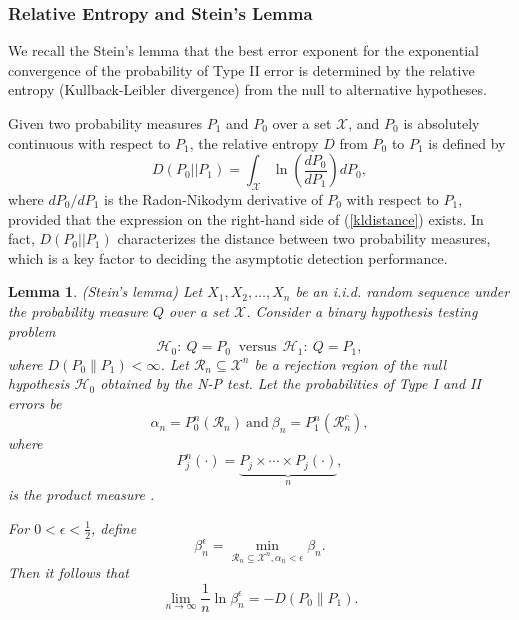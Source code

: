 \documentclass[journal]{IEEEtran}
\def\cH{\mathcal{H}}
\def\cR{\mathcal{R}}
\def\cX{\mathcal{X}}
\def\bee{\begin{equation}}
\def\ene{\end{equation}}
\newtheorem{lem}{Lemma}
\begin{document}
\subsubsection{Relative Entropy and Stein's Lemma}
We recall the Stein's lemma \cite{cover2006eit} that the best error exponent for the exponential convergence of the probability of Type II error is determined by the relative entropy (Kullback-Leibler divergence) from the null to alternative hypotheses.

 Given two probability measures $P_1$ and $P_0$ over a set $\cX$, and $
P_0$ is absolutely continuous with respect to $P_1$, the relative entropy $D$ from $P_0$ to $P_1$ is defined by
\begin{equation}
\label{kldistance}
D({P_0} || {P_1})=\int_\cX\ln\left(\frac{dP_0}{dP_1} \right)dP_0,
\end{equation}
where $dP_0/dP_1 $ is the Radon-Nikodym derivative \cite{ash2000pam} of $P_0$ with respect to $P_1$, provided that the expression on the right-hand side of (\ref{kldistance}) exists. In fact, $D(P_0||P_1)$ characterizes the distance between two probability measures, which is a key factor to deciding the asymptotic detection performance.

\begin{lem}(Stein's lemma) \label{lem_chernoff}Let $X_{1},X_{2},\ldots,X_{n}$ be an i.i.d. random sequence under the probability measure $Q$ over a set $\cX$. Consider a binary hypothesis testing problem
\bee
\label{hypotest}
\cH_{0}:~Q=P_0~\text{ versus}~ ~\cH_{1}:~Q=P_1,
\ene where $D(P_{0} \lVert  P_{1} )<\infty$. Let $\cR_{n}\subseteq \cX^{n}$ be a rejection region of the null hypothesis $\cH_{0}$ obtained by the N-P test. Let the probabilities of Type I and II errors be
\begin{equation}
\alpha_{n}=P_{0}^{n}(\cR_{n})~\text{and}~ \beta_{n}=P_{1}^{n}(\cR_{n}^c),
\end{equation}
where $$P_{j}^{n}(\cdot)=\underbrace{P_{j}\times \cdots \times P_{j}(\cdot)}_{n},$$ is the product measure \cite{ash2000pam}.

For $0<\epsilon<\frac{1}{2}$, define
\begin{equation}
\beta_{n}^{\epsilon}=\mathop {\min }\limits_{{\cR_n} \subseteq {\cX ^n}, {\alpha _n} < \epsilon } {\beta _n}.
\end{equation}
Then it follows that
\begin{equation}
\mathop {\lim }\limits_{n \to \infty } \frac{1}{n}\ln \beta _n^\epsilon  =  - D({P_0} \lVert {P_1}).
\end{equation}
\end{lem}
\end{document}
